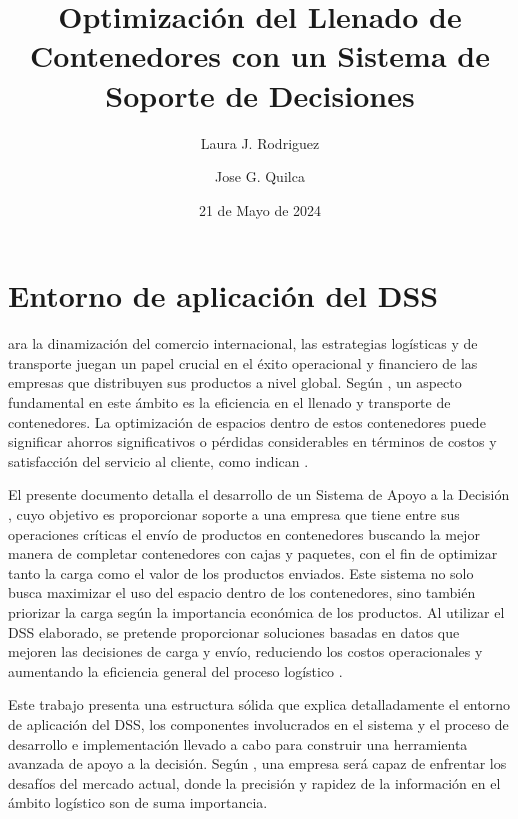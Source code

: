 \documentclass[9pt,a4paper]{rho}
\title{Optimización del Llenado de Contenedores con un Sistema de Soporte de Decisiones}
\author[$\dagger$]{Laura J. Rodriguez}
\author[$\dagger$]{Jose G. Quilca}
\affil[$\dagger$]{Centro de Investigación Operativa, Universidad Miguel Hernández, 03202 Elche, Alicante, España}
\date{21 de Mayo de 2024} %
\begin{document}
\maketitle
\thispagestyle{firststyle}


\section{Entorno de aplicación del DSS}

ara la dinamización del comercio internacional, las estrategias logísticas y de transporte juegan un papel crucial en el éxito operacional y financiero de las empresas que distribuyen sus productos a nivel global. Según \textcite{rushton2017international}, un aspecto fundamental en este ámbito es la eficiencia en el llenado y transporte de contenedores. La optimización de espacios dentro de estos contenedores puede significar ahorros significativos o pérdidas considerables en términos de costos y satisfacción del servicio al cliente, como indican \textcite{bortfeldt2013container}.

El presente documento detalla el desarrollo de un Sistema de Apoyo a la Decisión \cite{jao2010decision}, cuyo objetivo es proporcionar soporte a una empresa que tiene entre sus operaciones críticas el envío de productos en contenedores buscando la mejor manera de completar contenedores con cajas y paquetes, con el fin de optimizar tanto la carga como el valor de los productos enviados. Este sistema no solo busca maximizar el uso del espacio dentro de los contenedores, sino también priorizar la carga según la importancia económica de los productos. Al utilizar el DSS elaborado, se pretende proporcionar soluciones basadas en datos que mejoren las decisiones de carga y envío, reduciendo los costos operacionales y aumentando la eficiencia general del proceso logístico \cite{simchi2003logistics}.

Este trabajo presenta una estructura sólida que explica detalladamente el entorno de aplicación del DSS, los componentes involucrados en el sistema y el proceso de desarrollo e implementación llevado a cabo para construir una herramienta avanzada de apoyo a la decisión. Según \textcite{christopher2016logistics}, una empresa será capaz de enfrentar los desafíos del mercado actual, donde la precisión y rapidez de la información en el ámbito logístico son de suma importancia.
\end{document}
